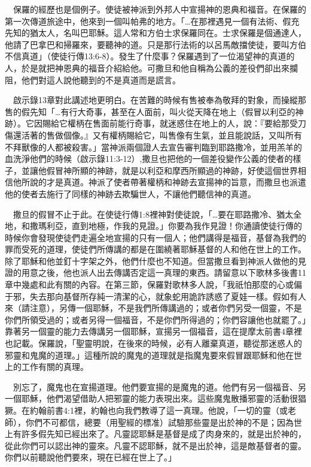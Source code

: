 \documentclass{book}
\begin{document}
　保羅的經歷也是個例子。使徒被神派到外邦人中宣揚神的恩典和福音。在保羅的第一次傳道旅途中，他來到一個叫帕弗的地方。「…在那裡遇見一個有法術、假充先知的猶太人，名叫巴耶穌。這人常和方伯士求保羅同在。士求保羅是個通達人，他請了巴拿巴和掃羅來，要聽神的道。只是那行法術的以呂馬敵擋使徒，要叫方伯不信真道」（使徒行傳13:6-8）。發生了什麼事？保羅遇到了一位渴望神的真道的人，於是就把神恩典的福音介紹給他。可撒旦和他自稱為公義的差役們卻出來攔阻，他們對這人說他聽到的不是真道而是謊言。

　啟示錄13章對此講述地更明白。在苦難的時候有售被奉為敬拜的對象，而操縱那售的假先知「…有行大奇事，甚至在人面前，叫火從天降在地上（假冒以利亞的神跡）。它因賜給它權柄在售面前能行奇事，就迷惑住在地上的人，說：『要給那受刀傷還活著的售做個像。』又有權柄賜給它，叫售像有生氣，並且能說話，又叫所有不拜獸像的人都被殺害。」當神派兩個證人去宣告審判臨到耶路撒冷，並用羔羊的血洗淨他們的時候（啟示錄11:3-12）,撒旦也把他的一個差役變作公義的使者的樣子，並讓他假冒神所顯的神跡，就是以利亞和摩西所顯過的神跡，好使這個世界相信他所說的才是真道。神派了使者帶著權柄和神跡去宣揚神的旨意，而撒旦也派遣他的使者去施行了同樣的神跡去欺騙世人，不讓他們聽信神的真道。

　撒旦的假冒不止于此。在使徒行傳1:8裡神對使徒說，「…要在耶路撒冷、猶太全地，和撒瑪利亞，直到地極，作我的見證。」你要為我作見證！你通讀使徒行傳的時候你會發現使徒們走遍全地宣揚的只有一個人；他們講得是福音，基督為我們的罪而受死的道理，使徒們所傳講的都是在圍繞著耶穌基督的人和他在世上的工作。除了耶穌和他並釘十字架之外，他們什麼也不知道。但當撒旦看到神派人做他的見證的用意之後，他也派人出去傳講否定這一真理的東西。請留意以下歌林多後書11章中幾處和此有關的內容。在第三節，保羅對歌林多人說，「我祇怕那麼的心或偏于邪，失去那向基督所存純一清潔的心，就象蛇用詭詐誘惑了夏娃一樣。假如有人來（請注意），另傳一個耶穌，不是我們所傳講過的；或者你們另受一個靈，不是你們所領受過的；或者另得一個福音，不是你們所得過的；你們容讓他也就罷了。」靠著另一個靈的能力去傳講另一個耶穌，宣揚另一個福音，這在提摩太前書4章裡也記載。保羅說，「聖靈明說，在後來的時候，必有人離棄真道，聽從那迷惑人的邪靈和鬼魔的道理。」這種所說的魔鬼的道理就是指魔鬼要來假冒跟耶穌和他在世上的工作有關的真理。

　別忘了，魔鬼也在宣揚道理。他們要宣揚的是魔鬼的道。他們有另一個福音、另一個耶穌，他們渴望借助人把邪靈的能力表現出來。這些魔鬼散播邪靈的活動很猖獗。在約翰前書4:1裡，約翰也向我們教導了這一真理。他說，「一切的靈（或老師），你們不可都信，總要（用聖經的標准）試驗那些靈是出於神的不是；因為世上有許多假先知已經出來了。凡靈認耶穌是基督是成了肉身來的，就是出於神的，從此你們可以認出神的靈來。凡靈不認耶穌，就不是出於神，這是敵基督者的靈。你們以前聽說他們要來，現在已經在世上了。」
\end{document}
